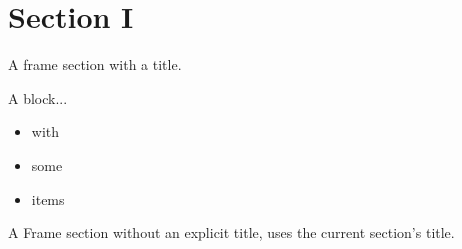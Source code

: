 \documentclass{beamer}
\newenvironment{framesection}[1][\insertsection]{
  \def\insertframesection{#1}
}{
  \def\insertframesection{}
}
\begin{document}
\section*{Section I}

\begin{framesection}[First series of frames]
  \begin{sframe}
    A frame section with a title.
  \end{sframe}

  \begin{sframe}
    \begin{block}{A block...}
        \begin{itemize}
          \item with 
          \item some
          \item items
        \end{itemize}
    \end{block}
  \end{sframe}

\end{framesection}

\begin{framesection}
  \begin{sframe}
    A Frame section without an explicit title, uses the current section's title.
  \end{sframe}
\end{framesection}
\end{document}
